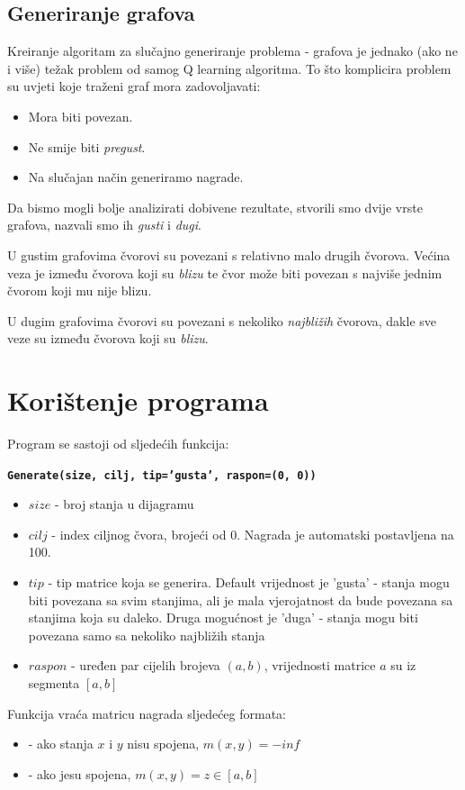 \documentclass[    DIV=calc, paper=a4,fontsize=11pt, twocolumn]{scrartcl}                     %
\begin{document}
\subsection*{Generiranje grafova}
Kreiranje algoritam za slučajno generiranje problema - grafova je jednako (ako ne i više) težak problem od samog Q learning algoritma. To što komplicira problem su uvjeti koje traženi graf mora zadovoljavati:
\begin{itemize}
\item
Mora biti povezan.
\item
Ne smije biti \emph{pregust}.
\item
Na slučajan način generiramo nagrade.
\end{itemize}

Da bismo mogli bolje analizirati dobivene rezultate, stvorili smo dvije vrste grafova, nazvali smo ih \emph{gusti} i \emph{dugi}.

U gustim grafovima čvorovi su povezani s relativno malo drugih čvorova. Većina veza je između čvorova koji su \emph{blizu} te
čvor može biti povezan s najviše jednim čvorom koji mu nije blizu.

U dugim grafovima čvorovi su povezani s nekoliko \emph{najbližih} čvorova, dakle sve veze su između čvorova koji su \emph{blizu}.


\section*{Korištenje programa}
Program se sastoji od sljedećih funkcija:

\vspace{0.4cm}
\noindent\textbf{\texttt{Generate(size, cilj, tip='gusta', raspon=(0, 0))}}
\begin{itemize}
\item    $size$  - broj stanja u dijagramu
\item    $cilj$  - index ciljnog čvora, brojeći od 0. Nagrada je automatski postavljena na 100.
\item    $tip$   - tip matrice koja se generira.
Default vrijednost je 'gusta' - stanja mogu biti povezana sa svim stanjima, ali je mala vjerojatnost da bude povezana sa stanjima koja su daleko. Druga mogućnost je 'duga' - stanja mogu biti povezana samo sa nekoliko najbli\v{z}ih stanja
\item    $raspon$ - uređen par cijelih brojeva $(a, b)$, vrijednosti matrice $a$ su iz segmenta $[a, b]$
\end{itemize}
Funkcija vraća matricu nagrada sljedećeg formata:
\begin{itemize}
\item         - ako stanja $x$ i $y$ nisu spojena, $m(x, y) = -inf$
\item         - ako jesu spojena, $m(x, y) = z \in [a, b]$
\end{itemize}
\end{document}
